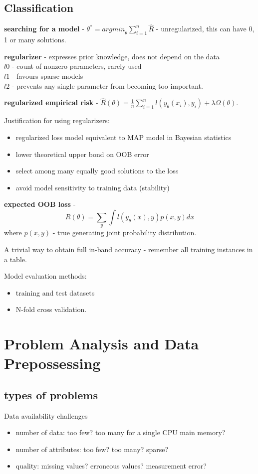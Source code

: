 \documentclass{article}
\newcommand{\para}[0]{\par\vspace{0.2cm}\noindent}
\newcommand{\define}[2]{\textbf{#1} - {#2}.  \para}
\begin{document}
\subsection{Classification}
\define{searching for a model}
           {$\theta^* = {argmin}_\theta \sum_{i=1}^n \hat R$ - unregularized, this can have 0, 1 or many solutions}

\define{regularizer}
           {expresses prior knowledge, does not depend on the data  \\
            $l0$ - count of nonzero parameters, rarely used  \\
            $l1$ - favours sparse models  \\
            $l2$ - prevents any single parameter from becoming too important}
\para
\define{regularized empirical risk}
           {$\hat R(\theta) = \frac{1}{n} \sum_{i=1}^n l(y_\theta(x_i), y_i) + \lambda \Omega (\theta)$}

Justification for using regularizers:
\begin{itemize}
    \item{regularized loss model equivalent to MAP model in Bayesian statistics}
    \item{lower theoretical upper bond on OOB error}
    \item{select among many equally good solutions to the loss}
    \item{avoid model sensitivity to training data (stability)}
\end{itemize}
\para
\define{expected OOB loss}{
    $$R(\theta) = \sum_y \int l(y_\theta(x), y) p(x, y) dx$$
    where $p(x, y)$ - true generating joint probability distribution}

A trivial way to obtain full in-band accuracy - remember all training instances in a table.  \\
\par
Model evaluation methods:
\begin{itemize}
    \item{training and test datasets}
    \item{N-fold cross validation.}
\end{itemize}


\section{Problem Analysis and Data Prepossessing}
\subsection{types of problems}
Data availability challenges
\begin{itemize}
    \item{number of data: too few? too many for a single CPU main memory?}
    \item{number of attributes: too few? too many? sparse?}
    \item{quality: missing values? erroneous values? measurement error?}
\end{itemize}
\end{document}
